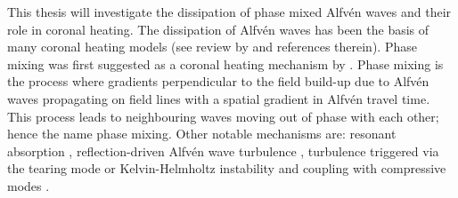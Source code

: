 This thesis will investigate the dissipation of phase mixed Alfv\'en waves and their role in coronal heating. The dissipation of Alfvén waves has been the basis of many coronal heating models (see review by \citealt{Arregui2015} and references therein). Phase mixing was first suggested as a coronal heating mechanism by \citet{Heyvaerts1983}. Phase mixing is the process where gradients perpendicular to the field build-up due to Alfvén waves propagating on field lines with a spatial gradient in Alfvén travel time. This process leads to neighbouring waves moving out of phase with each other; hence the name phase mixing. Other notable mechanisms are: resonant absorption \citep{Ionson1982}, reflection-driven Alfvén wave turbulence \citep{Hollweg1986a,vanBallegooijen2011,Shoda2019}, turbulence triggered via the tearing mode or Kelvin-Helmholtz instability \citep{Browning1984,Antolin2016,Antolin2018} and coupling with compressive modes \citep{Kudoh1999, Antolin2010}.

